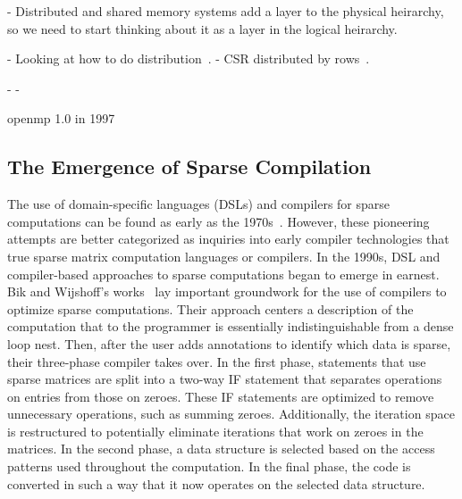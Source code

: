 - Distributed and shared memory systems add a layer to the physical heirarchy, so we need to start thinking about it as a layer in the logical heirarchy. %

- Looking at how to do distribution~\cite{ogielski1993sparse}.
- CSR distributed by rows~\cite{erhel1995parallel}.

- 
\cite{filippone2000psblas}
- 

openmp 1.0 in 1997~\cite{dagum1998openmp}

\cite{bouaricha1994tensor} 
\cite{bouaricha1999tensor}
\cite{lin2002efficient}
\cite{kolda2008scalable}

\cite{irwin1997aspect}



\subsection{The Emergence of Sparse Compilation}

The use of domain-specific languages (DSLs) and compilers for sparse computations can be found as early as the 1970s~\cite{calahan1971description,mchugh1974simpl}.
However, these pioneering attempts are better categorized as inquiries into early compiler technologies that true sparse matrix computation languages or compilers. 
In the 1990s, DSL and compiler-based approaches to sparse computations began to emerge in earnest.
Bik and Wijshoff's works~\cite{bik1993compilation, bik1993automatic,bik1996automatic} lay important groundwork for the use of compilers to optimize sparse computations.
Their approach centers a description of the computation that to the programmer is essentially indistinguishable from a dense loop nest. 
Then, after the user adds annotations to identify which data is sparse, their three-phase compiler takes over.
In the first phase, statements that use sparse matrices are split into a two-way IF statement that separates operations on entries from those on zeroes. 
These IF statements are optimized to remove unnecessary operations, such as summing zeroes.
Additionally, the iteration space is restructured to potentially eliminate iterations that work on zeroes in the matrices. 
In the second phase, a  data structure is selected based on the access patterns used throughout the computation. 
In the final phase, the code is converted in such a way that it now operates on the selected data structure.

